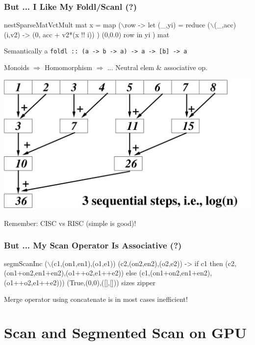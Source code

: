 \documentclass{beamer}
\newcommand{\mymath}[1]{$ #1 $}
\begin{document}
\begin{frame}[fragile,t]
\frametitle{But ... I Like My Foldl/Scanl (?)}

\begin{colorcode}[fontsize=\scriptsize]
nestSparseMatVctMult mat x = 
    map (\mymath{\backslash}row -> let (_,yi) = reduce (\mymath{\backslash}(_,acc) (i,v2) ->
                                           \alert{(0, acc + v2*(x !! i))}
                                     ) (0,0.0) row
             in yi
        ) mat
\end{colorcode}
\pause

Semantically a {\tt foldl :: (a -> b -> a) -> a -> [b] -> a}

\medskip
Monoids $\Rightarrow$ Homomorphism $\Rightarrow$ ...
\alert{Neutral elem \& associative op}.\medskip

\includegraphics[height=22ex]{Figures/ReduceEg.pdf} 

Remember: CISC vs RISC (simple is good)!

\end{frame}


\begin{frame}[fragile,t]
\frametitle{But ... My Scan Operator Is Associative (?)}

\begin{colorcode}[fontsize=\scriptsize]
segmScanInc (\mymath{\backslash}(c1,(on1,en1),(o1,e1)) (c2,(on2,en2),(o2,e2)) -> 
                if c1 then (c2,(on1+on2,en1+en2),(o1\alert{++}o2,e1\alert{++}e2)) 
                else (c1,(on1+on2,en1+en2),(o1\alert{++}o2,e1\alert{++}e2))) 
            (True,(0,0),([],[])) sizes zipper
\end{colorcode}
\medskip

Merge operator using concatenate is in most cases inefficient!

\end{frame}


\section{Scan and Segmented Scan on GPU}
\end{document}
